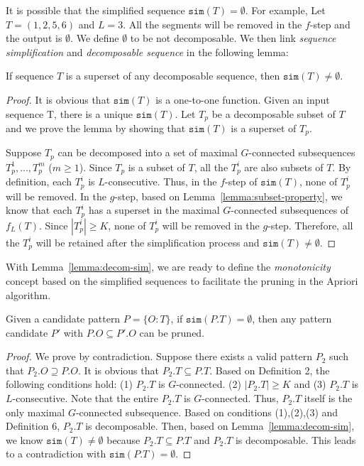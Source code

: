 It is possible that the simplified sequence $\mathtt{sim}(T)=\emptyset$. For example, Let $T=(1,2,5,6)$ 
and $L=3$. All the segments will be removed in the $f$-step and the output is $\emptyset$.
We define $\emptyset$ to be not decomposable. 
We then link \emph{sequence simplification} and \emph{decomposable sequence} in the following lemma:
\begin{lemma}\label{lemma:decom-sim}
If sequence $T$ is a superset of any decomposable sequence, then $\mathtt{sim}(T) \neq \emptyset$.
\end{lemma}
\begin{proof}
It is obvious that $\mathtt{sim}(T)$ is a one-to-one function. Given an input sequence T, there is a unique  $\mathtt{sim}(T)$. Let $T_p$ be a decomposable subset of $T$ and we prove the lemma by showing that $\mathtt{sim}(T)$ is a superset of $T_p$.

Suppose $T_p$ can be decomposed into a set of maximal $G$-connected
subsequences $T_p^1, \ldots, T_p^m$ ($m \geq 1$). Since $T_p$ is a subset of $T$, all the $T_p^i$ are also subsets of $T$. By definition, each $T_p^i$ is $L$-consecutive. Thus, in the $f$-step of $\mathtt{sim}(T)$, none of $T_p^i$ will be removed. In the $g$-step, based on Lemma~\ref{lemma:subset-property}, we know that each $T_p^i$ has a superset in the maximal $G$-connected subsequences of $f_L(T)$. Since $|T_p^i|\geq K$, none of $T_p^i$ will be removed in the $g$-step. Therefore, all the $T_p^i$ will be retained after the simplification process and $\mathtt{sim}(T) \neq \emptyset$.
\end{proof}

With Lemma~\ref{lemma:decom-sim}, we are ready to define the \emph{monotonicity} concept based on the simplified
sequences to facilitate the pruning in the Apriori algorithm. 

\begin{theorem}[Monotonicity]\label{THM:SPARE_MONO}
Given a candidate pattern $P=\{O:T\}$, if $\mathtt{sim}(P.T)=\emptyset$, then any pattern candidate $P'$ with $P.O \subseteq P'.O$ can be pruned.
\end{theorem}

\begin{proof}
We prove by contradiction. Suppose there exists a valid pattern $P_2$ such that $P_2.O \supseteq P.O$. It is obvious that $P_2.T \subseteq P.T$. Based on Definition 2, the following conditions hold: (1) $P_2.T$ is $G$-connected. (2) $|P_2.T| \geq K$ and (3) $P_2.T$ is $L$-consecutive. Note that the entire $P_2.T$ is $G$-connected. Thus, $P_2.T$ itself is the only maximal $G$-connected subsequence. Based on conditions (1),(2),(3) and Definition 6, $P_2.T$ is decomposable. Then, based on Lemma~\ref{lemma:decom-sim}, we know $\mathtt{sim}(T)\neq \emptyset$ because $P_2.T \subseteq P.T$ and $P_2.T$ is decomposable. This leads to a contradiction with $\mathtt{sim}(P.T)=\emptyset$.
\end{proof}

